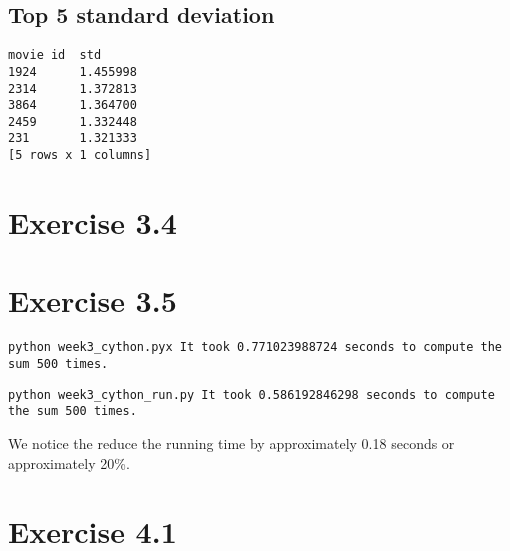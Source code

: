 \documentclass{article}
\begin{document}
\subsection{Top 5 standard deviation}

\begin{verbatim}
movie id  std
1924      1.455998
2314      1.372813
3864      1.364700
2459      1.332448
231       1.321333
[5 rows x 1 columns]
\end{verbatim}

\section{Exercise 3.4}
\section{Exercise 3.5}

\texttt{python week3\_cython.pyx It took 0.771023988724 seconds to compute the sum 500 times.}

\texttt{python week3\_cython\_run.py
It took 0.586192846298 seconds to compute the sum 500 times.}

We notice the reduce the running time by approximately 0.18 seconds or approximately 20\%.

\section{Exercise 4.1}
\end{document}
